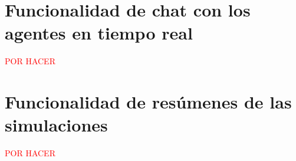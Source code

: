 \section{Funcionalidad de chat con los agentes en tiempo real}

\textcolor{red}{POR HACER}

\section{Funcionalidad de resúmenes de las simulaciones}

\textcolor{red}{POR HACER}

